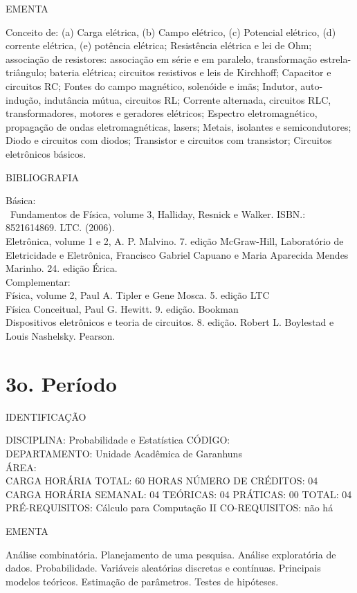 \documentclass[
	12pt,				%
	openright,			%
  oneside,     %
	a4paper,			%
	chapter=TITLE,		%
	english,			%
	french,				%
	spanish,			%
	brazil				%
	]{abntex2}
\begin{document}
\begin{apendicesenv}
EMENTA 

Conceito de: (a) Carga elétrica, (b) Campo elétrico, (c) Potencial
elétrico, (d) corrente elétrica, (e) potência elétrica; Resistência
elétrica e lei de Ohm; associação de resistores: associação em série e
em paralelo, transformação estrela-triângulo; bateria elétrica;
circuitos resistivos e leis de Kirchhoff; Capacitor e circuitos RC;
Fontes do campo magnético, solenóide e imãs; Indutor, auto-indução,
indutância mútua, circuitos RL; Corrente alternada, circuitos RLC,
transformadores, motores e geradores elétricos; Espectro
eletromagnético, propagação de ondas eletromagnéticas, lasers; Metais,
isolantes e semicondutores; Diodo e circuitos com diodos; Transistor e
circuitos com transistor; Circuitos eletrônicos básicos.

BIBLIOGRAFIA 

Básica:\\\
Fundamentos de Física, volume 3, Halliday, Resnick e Walker. ISBN.:
8521614869. LTC. (2006).\\
Eletrônica, volume 1 e 2, A. P. Malvino. 7. edição McGraw-Hill,
Laboratório de Eletricidade e Eletrônica, Francisco Gabriel Capuano e
Maria Aparecida Mendes Marinho. 24. edição Érica.\\
Complementar:\\
Física, volume 2, Paul A. Tipler e Gene Mosca. 5. edição LTC\\
Física Conceitual, Paul G. Hewitt. 9. edição. Bookman\\
Dispositivos eletrônicos e teoria de circuitos. 8. edição. Robert L.
Boylestad e Louis Nashelsky. Pearson.
\newpage

\section*{3o. Período}

IDENTIFICAÇÃO 

DISCIPLINA: Probabilidade e Estatística CÓDIGO:\\
DEPARTAMENTO: Unidade Acadêmica de Garanhuns\\
ÁREA: \\
CARGA HORÁRIA TOTAL: 60 HORAS NÚMERO DE CRÉDITOS: 04\\
CARGA HORÁRIA SEMANAL: 04 TEÓRICAS: 04 PRÁTICAS: 00 TOTAL: 04\\
PRÉ-REQUISITOS: Cálculo para Computação II
CO-REQUISITOS: não há

EMENTA 

Análise combinatória. Planejamento de uma pesquisa. Análise exploratória
de dados. Probabilidade. Variáveis aleatórias discretas e contínuas.
Principais modelos teóricos. Estimação de parâmetros. Testes de
hipóteses.


\end{apendicesenv}
\end{document}
